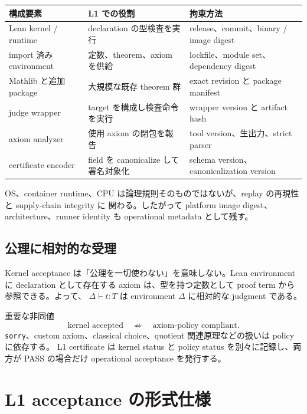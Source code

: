 \documentclass[a4paper,11pt]{ltjsarticle}
\newcommand{\code}[1]{\texttt{#1}}
\begin{document}
{\small
\begin{tabularx}{0.96\linewidth}{L{37mm}YY}
\toprule
\textbf{構成要素} & \textbf{L1 での役割} & \textbf{拘束方法} \\
\midrule
Lean kernel / runtime & declaration の型検査を実行 & release、commit、binary / image digest \\
import 済み environment & 定数、theorem、axiom を供給 & lockfile、module set、dependency digest \\
Mathlib と追加 package & 大規模な既存 theorem 群 & exact revision と package manifest \\
judge wrapper & target を構成し検査命令を実行 & wrapper version と artifact hash \\
axiom analyzer & 使用 axiom の閉包を報告 & tool version、生出力、strict parser \\
certificate encoder & field を canonicalize して署名対象化 & schema version、canonicalization version \\
\bottomrule
\end{tabularx}}

OS、container runtime、CPU は論理規則そのものではないが、replay の再現性と supply-chain integrity に
関わる。したがって platform image digest、architecture、runner identity も operational metadata として残す。

\subsection{公理に相対的な受理}

Kernel acceptance は「公理を一切使わない」を意味しない。Lean environment に declaration として存在する
axiom は、型を持つ定数として proof term から参照できる\cite{leanaxioms}。よって、
\(\Delta \vdash t : T\) は environment \(\Delta\) に相対的な judgment である。

\begin{warningbox}{重要な非同値}
\[\text{kernel accepted} \quad\not\Rightarrow\quad \text{axiom-policy compliant}.\]
\code{sorry}、custom axiom、classical choice、quotient 関連原理などの扱いは policy に依存する。
L1 certificate は kernel status と policy status を別々に記録し、両方が PASS の場合だけ
operational acceptance を発行する。
\end{warningbox}

\section{L1 acceptance の形式仕様}
\end{document}
